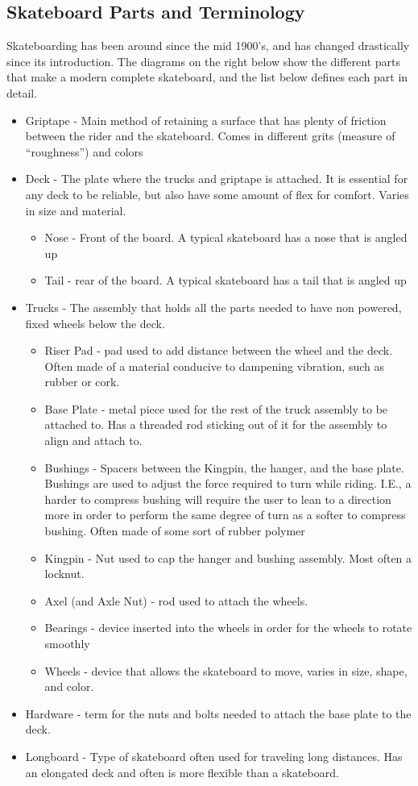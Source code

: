 \documentclass[a4paper,10pt]{article}
\begin{document}
\subsection{Skateboard Parts and Terminology}
Skateboarding has been around since the mid 1900’s, and has changed drastically since its introduction. The diagrams on the right below show the different parts that make a modern complete skateboard, and the list below defines each part in detail.
\begin{itemize}
\item Griptape - Main method of retaining a surface that has plenty of friction between the rider and the skateboard. Comes in different grits (measure of “roughness”) and colors
\item Deck - The plate where the trucks and griptape is attached. It is essential for any deck to be reliable, but also have some amount of flex for comfort. Varies in size and material.
\begin{itemize}
\item Nose - Front of the board. A typical skateboard has a nose that is angled up
\item Tail - rear of the board. A typical skateboard has a tail that is angled up
\end{itemize}
\item Trucks - The assembly that holds all the parts needed to have non powered, fixed wheels below the deck.
\begin{itemize}
\item Riser Pad - pad used to add distance between the wheel and the deck. Often made of a material conducive to dampening vibration, such as rubber or cork.
\item Base Plate - metal piece used for the rest of the truck assembly to be attached to. Has a threaded rod sticking out of it for the assembly to align and attach to.
\item Bushings - Spacers between the Kingpin, the hanger, and the base plate. Bushings are used to adjust the force required to turn while riding. I.E., a harder to compress bushing will require the user to lean to a direction more in order to perform the same degree of turn as a softer to compress bushing. Often made of some sort of rubber polymer
\item Kingpin - Nut used to cap the hanger and bushing assembly. Most often a locknut.
\item Axel (and Axle Nut) - rod used to attach the wheels.
\item Bearings - device inserted into the wheels in order for the wheels to rotate smoothly
\item Wheels - device that allows the skateboard to move, varies in size, shape, and color.
\end{itemize}
\item Hardware - term for the nuts and bolts needed to attach the base plate to the deck.
\item Longboard - Type of skateboard often used for traveling long distances. Has an elongated deck and often is more flexible than a skateboard.
\end{itemize}
\end{document}
